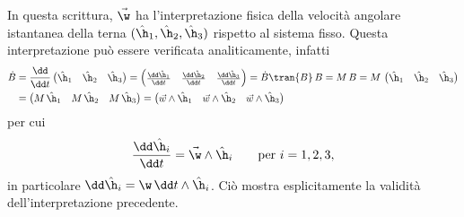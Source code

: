 \begin{oss}
	In questa scrittura, \(\vec{\w}\) ha l'interpretazione fisica della velocità angolare istantanea della terna \((\hat{\h}_1,\hat{\h}_2,\hat{\h}_3)\) rispetto al sistema fisso. Questa interpretazione può essere verificata analiticamente, infatti
	\[
		\begin{split}
			\dot{B} & = \frac{\dd}{\dd t}\begin{pmatrix}\hat{\h}_1 & \hat{\h}_2 & \hat{\h}_3\end{pmatrix} = \begin{pmatrix}\frac{\dd\hat{\h}_1}{\dd t} & \frac{\dd\hat{\h}_2}{\dd t} & \frac{\dd\hat{\h}_3}{\dd t}\end{pmatrix} = \dot{B}\tran{B}\,B = M\,B = M\,\begin{pmatrix}\hat{\h}_1 & \hat{\h}_2 & \hat{\h}_3\end{pmatrix}\\
			& = \begin{pmatrix}M\,\hat{\h}_1 & M\,\hat{\h}_2 & M\,\hat{\h}_3\end{pmatrix} = \begin{pmatrix}\vec{w}\wedge\hat{\h}_1 & \vec{w}\wedge\hat{\h}_2 & \vec{w}\wedge\hat{\h}_3\end{pmatrix}
		\end{split}
	\]
	per cui
	\[
		\frac{\dd\hat{\h}_i}{\dd t} = \vec{\w}\wedge\hat{\h}_i \qquad\text{per }i=1,2,3,
	\]
	in particolare \(\dd\hat{\h}_i=\w\,\dd t \wedge \hat{\h}_i\).
	Ciò mostra esplicitamente la validità dell'interpretazione precedente.
\end{oss}

